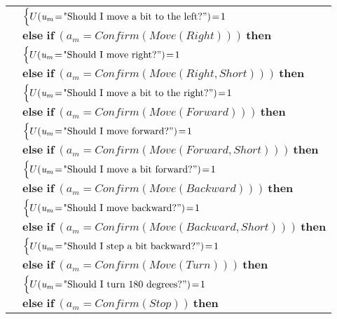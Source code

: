 \begin{footnotesize}
\begin{longtable}{p{2cm}l}
& \;\;\;\;\; $ \begin{cases}U(\mathit{u_m}\!=\!\text{"Should I move a bit to the left?}")\!=\!1 \end{cases}$\\[3mm] & $ \textbf{else if} \ (\mathit{a_m}\!=\!\mathit{Confirm(Move(Right))}) \ \textbf{then}$ \\
& \;\;\;\;\; $ \begin{cases}U(\mathit{u_m}\!=\!\text{"Should I move right?}")\!=\!1 \end{cases}$\\[3mm] & $ \textbf{else if} \ (\mathit{a_m}\!=\!\mathit{Confirm(Move(Right,Short))}) \ \textbf{then}$ \\
& \;\;\;\;\; $ \begin{cases}U(\mathit{u_m}\!=\!\text{"Should I move a bit to the right?}")\!=\!1 \end{cases}$\\[3mm] & $ \textbf{else if} \ (\mathit{a_m}\!=\!\mathit{Confirm(Move(Forward))}) \ \textbf{then}$ \\
& \;\;\;\;\; $ \begin{cases}U(\mathit{u_m}\!=\!\text{"Should I move forward?}")\!=\!1 \end{cases}$\\[3mm] & $ \textbf{else if} \ (\mathit{a_m}\!=\!\mathit{Confirm(Move(Forward,Short))}) \ \textbf{then}$ \\
& \;\;\;\;\; $ \begin{cases}U(\mathit{u_m}\!=\!\text{"Should I move a bit forward?}")\!=\!1 \end{cases}$\\[3mm] & $ \textbf{else if} \ (\mathit{a_m}\!=\!\mathit{Confirm(Move(Backward))}) \ \textbf{then}$ \\
& \;\;\;\;\; $ \begin{cases}U(\mathit{u_m}\!=\!\text{"Should I move backward?}")\!=\!1 \end{cases}$\\[3mm] & $ \textbf{else if} \ (\mathit{a_m}\!=\!\mathit{Confirm(Move(Backward,Short))}) \ \textbf{then}$ \\
& \;\;\;\;\; $ \begin{cases}U(\mathit{u_m}\!=\!\text{"Should I step a bit backward?}")\!=\!1 \end{cases}$\\[3mm] & $ \textbf{else if} \ (\mathit{a_m}\!=\!\mathit{Confirm(Move(Turn))}) \ \textbf{then}$ \\
& \;\;\;\;\; $ \begin{cases}U(\mathit{u_m}\!=\!\text{"Should I turn 180 degrees?}")\!=\!1 \end{cases}$\\[3mm] & $ \textbf{else if} \ (\mathit{a_m}\!=\!\mathit{Confirm(Stop)}) \ \textbf{then}$ \\

\end{longtable}
\end{footnotesize}
